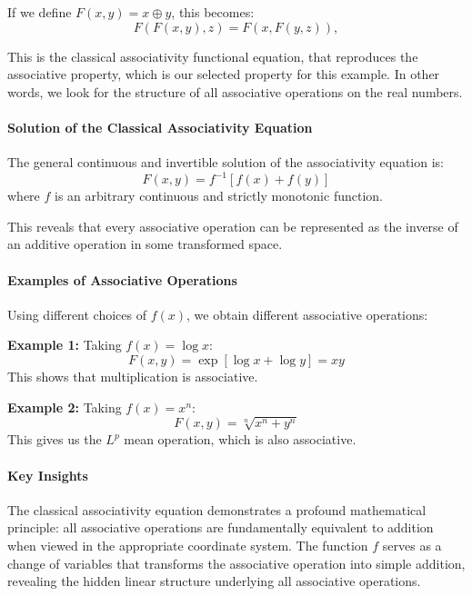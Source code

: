 If we define $F(x, y) = x \oplus y$, this becomes:
\begin{equation}
F(F(x, y), z) = F(x, F(y, z)),
\end{equation}

This is the classical associativity functional equation, that reproduces the associative property, which is our selected property for this example. In other words, we look for the structure of all associative operations on the real numbers.

\paragraph{Solution of the Classical Associativity Equation}
The general continuous and invertible solution of the associativity equation is:
\begin{equation}
\boxed{F(x, y) = f^{-1}[f(x) + f(y)]}
\end{equation}
where $f$ is an arbitrary continuous and strictly monotonic function.

This reveals that every associative operation can be represented as the inverse of an additive operation in some transformed space.

\paragraph{Examples of Associative Operations}
Using different choices of $f(x)$, we obtain different associative operations:

\textbf{Example 1:} Taking $f(x) = \log x$:
\begin{equation}
F(x, y) = \exp[\log x + \log y] = xy
\end{equation}
This shows that multiplication is associative.

\textbf{Example 2:} Taking $f(x) = x^n$:
\begin{equation}
F(x, y) = \sqrt[n]{x^n + y^n}
\end{equation}
This gives us the $L^p$ mean operation, which is also associative.

\paragraph{Key Insights}
The classical associativity equation demonstrates a profound mathematical principle: all associative operations are fundamentally equivalent to addition when viewed in the appropriate coordinate system. The function $f$ serves as a change of variables that transforms the associative operation into simple addition, revealing the hidden linear structure underlying all associative operations.

